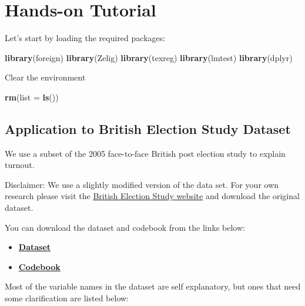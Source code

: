 \documentclass[]{article}
\newenvironment{Shaded}{\begin{snugshade}}{\end{snugshade}}
\newcommand{\KeywordTok}[1]{\textcolor[rgb]{0.13,0.29,0.53}{\textbf{{#1}}}}
\newcommand{\DataTypeTok}[1]{\textcolor[rgb]{0.13,0.29,0.53}{{#1}}}
\newcommand{\NormalTok}[1]{{#1}}
\providecommand{\tightlist}{%
  \setlength{\itemsep}{0pt}\setlength{\parskip}{0pt}}
\theoremstyle{definition}
\theoremstyle{definition}
\theoremstyle{remark}
\begin{document}
\section{Hands-on Tutorial}\label{hands-on-tutorial}

Let's start by loading the required packages:

\begin{Shaded}
\begin{Highlighting}[]
\KeywordTok{library}\NormalTok{(foreign) }
\KeywordTok{library}\NormalTok{(Zelig) }
\KeywordTok{library}\NormalTok{(texreg) }
\KeywordTok{library}\NormalTok{(lmtest)}
\KeywordTok{library}\NormalTok{(dplyr)}
\end{Highlighting}
\end{Shaded}

Clear the environment

\begin{Shaded}
\begin{Highlighting}[]
\KeywordTok{rm}\NormalTok{(}\DataTypeTok{list =} \KeywordTok{ls}\NormalTok{())}
\end{Highlighting}
\end{Shaded}

\subsection{Application to British Election Study
Dataset}\label{application-to-british-election-study-dataset}

We use a subset of the 2005 face-to-face British post election study to
explain turnout.

Disclaimer: We use a slightly modified version of the data set. For your
own research please visit the
\href{http://www.britishelectionstudy.com}{British Election Study
website} and download the original dataset.

You can download the dataset and codebook from the links below:

\begin{itemize}
\tightlist
\item
  \textbf{\href{http://uclspp.github.io/PUBLG100/data/bes.dta}{Dataset}}
\item
  \textbf{\href{http://uclspp.github.io/PUBLG100/data/bes_codebook.txt}{Codebook}}
\end{itemize}

Most of the variable names in the dataset are self explanatory, but ones
that need some clarification are listed below:
\end{document}

